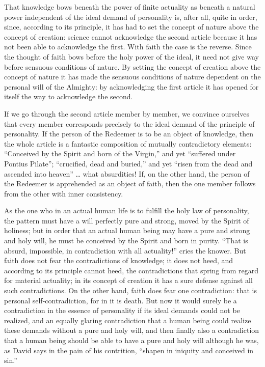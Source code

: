 \documentclass[12pt]{book}
\newcommand{\opage}[1]{\marginnote{\footnotesize\textit{[#1]}}}
\begin{document}
That knowledge bows beneath the power of finite actuality as beneath a
natural power independent of the ideal demand of personality is, after
all, quite in order, since, according to its principle, it has had to
set the concept of nature above the concept of creation: science cannot
acknowledge the second article because it has not been able to
acknowledge the first. With faith the case is the reverse. Since the
thought of faith bows before the holy power of the ideal, it need not
give way before sensuous conditions of nature. By setting the concept of
creation above the concept of nature it has made the sensuous conditions
of nature dependent on the personal will of the Almighty: by
acknowledging the first article it has opened for itself the way to
acknowledge the second.

If we go through the second article member by member, we convince
ourselves that every member corresponds precisely to the ideal demand
of the principle of personality. If the person of the Redeemer is to be
an object of knowledge, then the whole article is a fantastic
composition of mutually contradictory elements: ``Conceived by the
Spirit and born of the Virgin,'' and yet ``suffered under Pontius
Pilate''; ``crucified, dead and buried,'' and yet ``risen from the dead
and ascended into heaven'' \ldots{} what absurdities! If, on the other
hand, the person of the Redeemer is apprehended as an object of
\opage{150}\setcounter{footnote}{0}%
faith, then the one member follows from the other with inner
consistency.

As the one who in an actual human life is to fulfill the holy law of
personality, the pattern must have a will perfectly pure and strong,
moved by the Spirit of holiness; but in order that an actual human being
may have a pure and strong and holy will, he must be conceived by the
Spirit and born in purity. ``That is absurd, impossible, in
contradiction with all actuality!'' cries the knower. But faith does not
fear the contradictions of knowledge; it does not heed, and according to
its principle cannot heed, the contradictions that spring from regard
for material actuality; in its concept of creation it has a sure
defense against all such contradictions. On the other hand, faith does
fear one contradiction: that is personal self-contradiction, for in it
is death. But now it would surely be a contradiction in the essence of
personality if its ideal demands could not be realized, and an equally
glaring contradiction that a human being could realize these demands
without a pure and holy will, and then finally also a contradiction
that a human being should be able to have a pure and holy will although
he was, as David says in the pain of his contrition, ``shapen in
iniquity and conceived in sin.''
\end{document}
